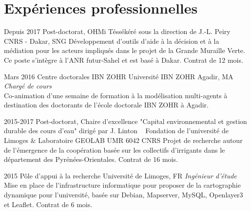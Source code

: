 \documentclass[]{cv-etienne}
\begin{document}
\section{Expériences professionnelles}
\begin{entrylist}
\entry
{Depuis 2017}
{Post-doctorat, OHMi Téssékéré  {\normalfont sous la direction de J.-L. Peiry} ~}
{CNRS - Dakar, SNG}
{Développement d'outils d'aide à la décision et à la médiation pour les acteurs impliqués dans le projet de la Grande Muraille Verte. Ce poste s'intègre à l'ANR futur-Sahel et est basé à Dakar. Contrat de 12 mois.}
\end{entrylist}
\begin{entrylist}
\entry
{Mars 2016}
{Centre doctorales IBN ZOHR}
{Université IBN ZOHR Agadir, MA}
{\emph{Chargé de cours} \\
Co-animation d'une semaine de formation à la modélisation multi-agents à destination des doctorants de l'école doctorale IBN ZOHR à Agadir.
}
\end{entrylist}
\begin{entrylist}
\entry
{2015-2017}
{Post-doctorat, Chaire d'excellence "Capital environnemental et gestion durable des cours d'eau"  {\normalfont dirigé par J. Linton} ~}
{Fondation de l'université de Limoges \& Laboratoire GEOLAB UMR 6042 CNRS}
{Projet de recherche autour de l'émergence de la coopération basée sur les collectifs d'irrigants dans le département des Pyrénées-Orientales. Contrat de 16 mois.}
\end{entrylist}
\begin{entrylist}
\entry
{2015}
{Pôle d'appui à la recherche}
{Université de Limoges, FR}
{\emph{Ingénieur d'étude} \\
Mise en place de l'infrastructure informatique pour proposer de la cartographie dynamique pour l'université, basée sur Debian, Mapserver, MySQL, Openlayer3 et Leaflet. Contrat de 6 mois.
}
\end{entrylist}
\end{document}
